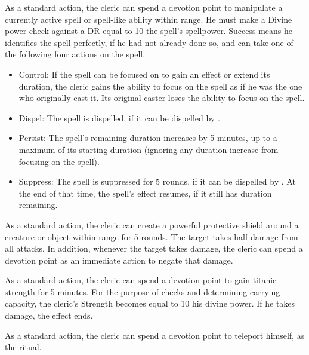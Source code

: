             As a standard action, the cleric can spend a devotion point to manipulate a currently active spell or spell-like ability within \rngmed range.
            He must make a Divine power check against a DR equal to 10 \add the spell's spellpower.
            Success means he identifies the spell perfectly, if he had not already done so, and can take one of the following four actions on the spell.
            \begin{itemize}
                \item Control: If the spell can be focused on to gain an effect or extend its duration, the cleric gains the ability to focus on the spell as if he was the one who originally cast it.
                    Its original caster loses the ability to focus on the spell.
                \item Dispel: The spell is dispelled, if it can be dispelled by .
                \item Persist: The spell's remaining duration increases by 5 minutes, up to a maximum of its starting duration (ignoring any duration increase from focusing on the spell).
                \item Suppress: The spell is suppressed for 5 rounds, if it can be dispelled by .
                    At the end of that time, the spell's effect resumes, if it still has duration remaining.
            \end{itemize}

            As a standard action, the cleric can create a powerful protective shield around a creature or object within \rngclose range for 5 rounds.
            The target takes half damage from all attacks.
            In addition, whenever the target takes damage, the cleric can spend a devotion point as an immediate action to negate that damage.

            As a standard action, the cleric can spend a devotion point to gain titanic strength for 5 minutes.
            For the purpose of checks and determining carrying capacity, the cleric's Strength becomes equal to 10 \add his divine power.
            If he takes damage, the effect ends.

            As a standard action, the cleric can spend a devotion point to teleport himself, as the  ritual.

